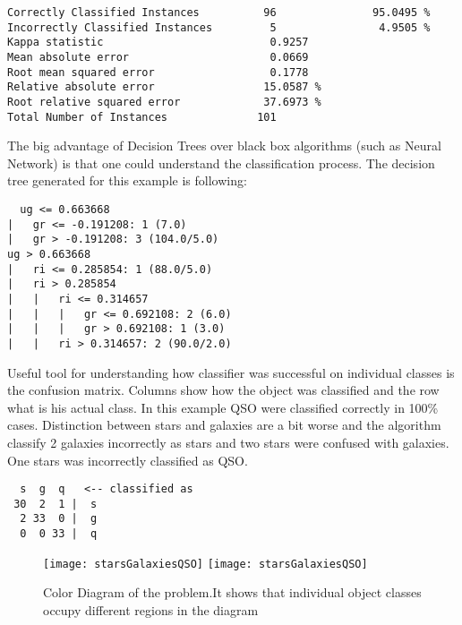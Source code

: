 \begin{lstlisting}
Correctly Classified Instances          96               95.0495 %
Incorrectly Classified Instances         5                4.9505 %
Kappa statistic                          0.9257
Mean absolute error                      0.0669
Root mean squared error                  0.1778
Relative absolute error                 15.0587 %
Root relative squared error             37.6973 %
Total Number of Instances              101     
\end{lstlisting}

The big advantage of Decision Trees over black box algorithms (such as
Neural Network) is that one could understand the classification
process. The decision tree generated for this example is following:

\begin{lstlisting}
  ug <= 0.663668
|   gr <= -0.191208: 1 (7.0)
|   gr > -0.191208: 3 (104.0/5.0)
ug > 0.663668
|   ri <= 0.285854: 1 (88.0/5.0)
|   ri > 0.285854
|   |   ri <= 0.314657
|   |   |   gr <= 0.692108: 2 (6.0)
|   |   |   gr > 0.692108: 1 (3.0)
|   |   ri > 0.314657: 2 (90.0/2.0)
\end{lstlisting}

Useful tool for understanding how classifier was successful on
individual classes is the confusion matrix. Columns show how the
object was classified and the row what is his actual class. In this
example QSO were classified correctly in 100\% cases. Distinction
between stars and galaxies are a bit worse and the algorithm classify
2 galaxies incorrectly as stars and two stars were confused with
galaxies. One stars was incorrectly classified as QSO.
 
\begin{lstlisting}
  s  g  q   <-- classified as
 30  2  1 |  s 
  2 33  0 |  g 
  0  0 33 |  q 
\end{lstlisting}
 
\begin{figure}[!htbp]
        \leavevmode
        \ifpdf
        \texttt{[image: starsGalaxiesQSO]}
        \else
        \texttt{[image: starsGalaxiesQSO]}
        \fi
        \caption{Color Diagram of the problem.It shows that individual
          object classes occupy different regions in the diagram }
        \label{FigStarsGalaxiesQSO}
\end{figure}

